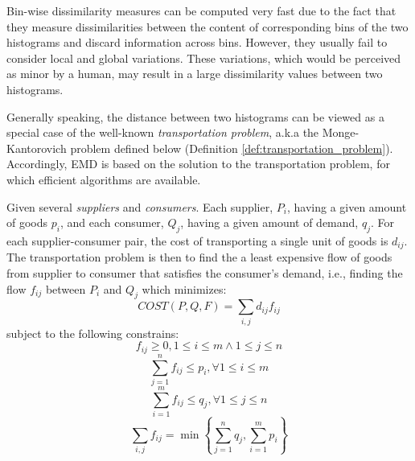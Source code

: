 \iftoggle{edit-mode}{\hspace{0pt}\marginpar{Drawback of binwise based measures}}{}
Bin-wise dissimilarity measures can be computed very fast due to the fact that they measure dissimilarities between the content of corresponding bins of the two histograms and discard information across bins. However, they usually fail to consider local and global variations. These variations, which would be perceived as minor by a human, may result in a large dissimilarity values between two histograms.

\iftoggle{edit-mode}{\hspace{0pt}\marginpar{The transportation problem}}{}
Generally speaking, the distance between two histograms can be viewed as a special case of the well-known \emph{transportation problem}, a.k.a the Monge-Kantorovich problem \cite{rachev1985monge} defined below (Definition \ref{def:transportation_problem}). Accordingly, EMD is based on the solution to the transportation problem, for which efficient algorithms are available.

\begin{definition}
\label{def:transportation_problem}
Given several \emph{suppliers} and \emph{consumers}. Each supplier, $P_i$, having a given amount of goods $p_i$, and each consumer, $Q_j$, having a given amount of demand, $q_j$. For each supplier-consumer pair, the cost of transporting a single unit of goods is $d_{ij}$. The transportation problem is then to find the a least expensive flow of goods from supplier to consumer that satisfies the consumer's demand, i.e., finding the flow $f_{ij}$ between $P_i$ and $Q_j$ which minimizes:
\begin{equation}
COST(P,Q,F)=\sum_{i,j} d_{ij}f_{ij} 
\end{equation}
subject to the following constrains:
\begin{equation}
f_{ij} \geq 0, 1\leq i \leq m \wedge 1\leq j \leq n 
\end{equation}
\begin{equation}
\sum\limits_{j=1}^{n} f_{ij} \leq p_i, \forall 1\leq i \leq m
\end{equation}
\begin{equation}
\sum\limits_{i=1}^{m} f_{ij} \leq q_j, \forall 1\leq j \leq n
\end{equation}
\begin{equation}
\sum\limits_{i,j} f_{ij} = \min\left\{ \sum\limits_{j=1}^{n} q_j, \sum\limits_{i=1}^{m} p_i \right\}
\end{equation}
\end{definition}

